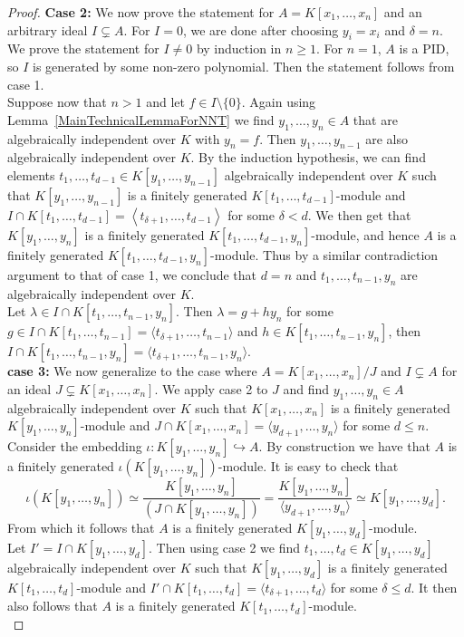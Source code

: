 \begin{proof}
        \noindent\textbf{Case 2:} We now prove the statement for $A = K[x_1,\dots,x_n]$ and an arbitrary ideal $I\subsetneq A$. For $I=0$, we are done after choosing $y_i = x_i$ and $\delta = n$. We prove the statement for $I\neq 0$ by induction in $n\geq 1$. For $n=1$, $A$ is a PID, so $I$ is generated by some non-zero polynomial. Then the statement follows from case 1.\\ 
        Suppose now that $n>1$ and let $f\in I\setminus\{0\}$. Again using Lemma~\ref{MainTechnicalLemmaForNNT} we find $y_1,\dots,y_n\in A$ that are algebraically independent over $K$ with $y_n = f$. Then $y_1,\dots,y_{n-1}$ are also algebraically independent over $K$. By the induction hypothesis, we can find elements $t_1,\dots, t_{d-1} \in K[y_1,\dots, y_{n-1}]$ algebraically independent over $K$ such that $K[y_1,\dots,y_{n-1}]$ is a finitely generated $K[t_1,\dots,t_{d-1}]$-module and $I \cap K[t_1,\dots, t_{d-1}] = \left\langle t_{\delta+1},\dots, t_{d-1} \right\rangle$ for some $\delta <d$. We then get that $K[y_1,\dots, y_n]$ is a finitely generated $K[t_1,\dots, t_{d-1},y_n]$-module, and hence $A$ is a finitely generated $K[t_1,\dots, t_{d-1},y_n]$-module. Thus by a similar contradiction argument to that of case 1, we conclude that $d=n$ and $t_1,\dots,t_{n-1},y_n$ are algebraically independent over $K$.\\ 
        Let $\lambda\in I\cap K[t_1,\dots,t_{n-1},y_n]$. Then $\lambda= g+hy_n$ for some $g\in I\cap K[t_1,\dots, t_{n-1}]=\langle t_{\delta+1},\dots,t_{n-1}\rangle$ and $h\in K[t_1,\dots, t_{n-1},y_n]$, then $I\cap K[t_1,\dots,t_{n-1},y_n]=\langle t_{\delta+1},\dots,t_{n-1},y_n\rangle$.\\

        \noindent \textbf{case 3:} We now generalize to the case where $A = K[x_1,\dots, x_n]/J$ and $I\subsetneq A$ for an ideal $J\subsetneq K[x_1,\dots,x_n]$. We apply case 2 to $J$ and find $y_1,\dots, y_n\in A$ algebraically independent over $K$ such that $K[x_1,\dots, x_n]$ is a finitely generated $K[y_1,\dots,y_n]$-module and $J\cap K[x_1,\dots,x_n]=\langle y_{d+1},\dots,y_{n}\rangle$ for some $d\leq n$. Consider the embedding $\iota : K[y_1,\dots, y_n] \hookrightarrow A$. By construction we have that $A$ is a finitely generated $\iota(K[y_1,\dots,y_n])$-module. It is easy to check that $$\iota(K[y_1,\dots,y_n])\simeq \frac{K[y_1,\dots,y_n]}{(J\cap K[y_1,\dots,y_n])} = \frac{K[y_1,\dots,y_n]}{\langle y_{d+1},\dots,y_n\rangle} \simeq K[y_1,\dots, y_d].$$  
        From which it follows that $A$ is a finitely generated $K[y_1,\dots, y_d]$-module.\\ 
        Let $I'=I\cap K[y_1,\dots,y_d]$. Then using case 2 we find $t_1,\dots,t_d\in K[y_1,\dots, y_d]$ algebraically independent over $K$ such that $K[y_1,\dots,y_d]$ is a finitely generated $K[t_1,\dots,t_d]$-module and $I'\cap K[t_1,\dots,t_d] = \langle t_{\delta +1},\dots, t_d\rangle$ for some $\delta \leq d$. It then also follows that $A$ is a finitely generated $K[t_1,\dots, t_d]$-module.\\ 
         

\end{proof}
